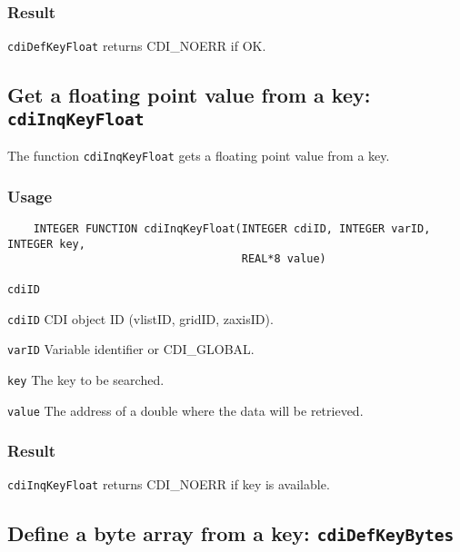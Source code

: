 \subsubsection*{Result}

{\texttt{cdiDefKeyFloat}} returns CDI\_NOERR if OK.



\subsection{Get a floating point value from a key: \texttt{cdiInqKeyFloat}}
\label{cdiInqKeyFloat}

The function {\texttt{cdiInqKeyFloat}} gets a floating point value from a key.

\subsubsection*{Usage}

\begin{verbatim}
    INTEGER FUNCTION cdiInqKeyFloat(INTEGER cdiID, INTEGER varID, INTEGER key, 
                                    REAL*8 value)
\end{verbatim}

\hspace*{4mm}\begin{minipage}[]{15cm}
\begin{deflist}{\texttt{cdiID}\ }
\item[\texttt{cdiID}]
CDI object ID (vlistID, gridID, zaxisID).
\item[\texttt{varID}]
Variable identifier or CDI\_GLOBAL.
\item[\texttt{key}]
The key to be searched.
\item[\texttt{value}]
The address of a double where the data will be retrieved.

\end{deflist}
\end{minipage}

\subsubsection*{Result}

{\texttt{cdiInqKeyFloat}} returns CDI\_NOERR if key is available.



\subsection{Define a byte array from a key: \texttt{cdiDefKeyBytes}}
\label{cdiDefKeyBytes}

